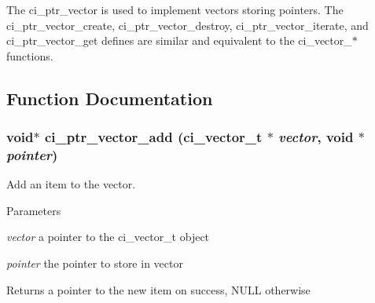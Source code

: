 The ci\_\-ptr\_\-vector is used to implement vectors storing pointers. The ci\_\-ptr\_\-vector\_\-create, ci\_\-ptr\_\-vector\_\-destroy, ci\_\-ptr\_\-vector\_\-iterate, and ci\_\-ptr\_\-vector\_\-get defines are similar and equivalent to the ci\_\-vector\_\-$\ast$ functions. 

\subsection{Function Documentation}
\hypertarget{group__PTR__VECTORS_gabbfd158c73af5c35cca903c8f7727434}{
\subsubsection[{ci\_\-ptr\_\-vector\_\-add}]{\setlength{\rightskip}{0pt plus 5cm}void$\ast$ ci\_\-ptr\_\-vector\_\-add ({\bf ci\_\-vector\_\-t} $\ast$ {\em vector}, \/  void $\ast$ {\em pointer})}}
\label{group__PTR__VECTORS_gabbfd158c73af5c35cca903c8f7727434}


Add an item to the vector. 
\begin{DoxyParams}{Parameters}
\item[{\em vector}]a pointer to the ci\_\-vector\_\-t object \item[{\em pointer}]the pointer to store in vector \end{DoxyParams}
\begin{DoxyReturn}{Returns}
a pointer to the new item on success, NULL otherwise 
\end{DoxyReturn}
